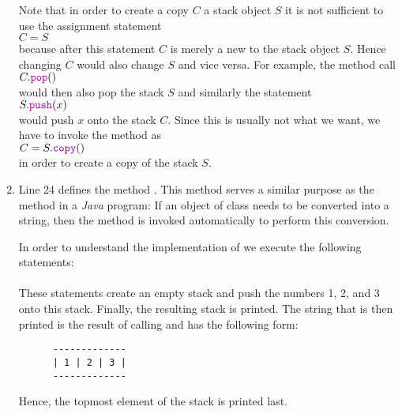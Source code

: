 \begin{enumerate}
      Note that in order to create a copy $C$ a stack object $S$ it is not sufficient to use the assignment statement
      \\[0.2cm]
      \hspace*{1.3cm}
      $C = S$
      \\[0.2cm]
      because after this statement $C$ is merely a new  to the stack object $S$.  Hence changing $C$
      would also change $S$ and vice versa.  For example, the method call
      \\[0.2cm]
      \hspace*{1.3cm}
      $C.\mytt{pop}()$
      \\[0.2cm]
      would then also pop the stack $S$ and similarly the statement
      \\[0.2cm]
      \hspace*{1.3cm}
      $S.\mytt{push}(x)$
      \\[0.2cm]
      would push $x$ onto the stack $C$.  Since this is usually not what we want, we have to invoke the method
       as 
      \\[0.2cm]
      \hspace*{1.3cm}
      $C = S.\mytt{copy}()$
      \\[0.2cm]
      in order to create a copy of the stack $S$.
\item Line 24 defines the method .  This method serves a similar purpose as the method
       in a \textsl{Java} program:  If an object of class  needs to
      be converted into a string, then the method  is invoked automatically to
      perform this conversion.

      In order to understand the implementation of  we execute the following statements:
      \\[0.2cm]
      \hspace*{1.3cm}
      \\[0.2cm]
      These statements create an empty stack and push the numbers 1, 2, and 3 
      onto this stack.  Finally, the resulting stack is printed.  The string that is then printed
      is the result of calling  and has the following form:
      \begin{verbatim}
      -------------
      | 1 | 2 | 3 |
      -------------
      \end{verbatim}
      \vspace*{-0.5cm}
      Hence, the topmost element of the stack is printed last.


\end{enumerate}
